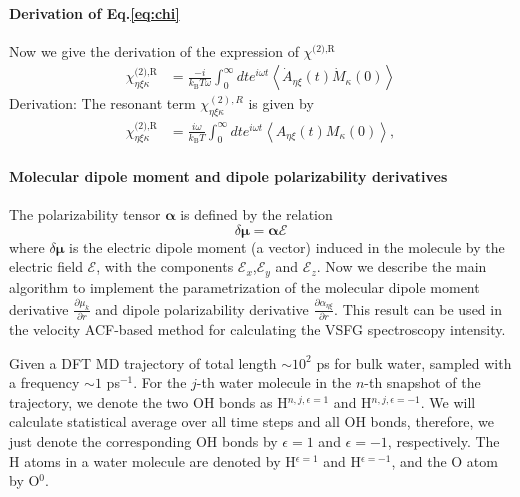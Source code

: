 \paragraph{Derivation of Eq.\thinspace\ref{eq:chi}}
Now we give the derivation of the expression of $\chi^{\text{(2),R}}$
\begin{align}
   \chi^{\text{(2),R}}_{\eta\xi\kappa}&=\frac{-i}{k_{\text{B}}T \omega} \int_0^\infty dt e^{i \omega t}\left\langle \dot{A}_{\eta\xi}(t) \dot{M}_{\kappa}(0)\right\rangle
\end{align}
Derivation: 
The resonant term $\chi^{(2),R}_{\eta\xi\kappa}$ is given by \cite{Morita2008}
\begin{align}
  \chi^{\text{(2),R}}_{\eta\xi\kappa}&=\frac{i\omega}{k_{\text{B}}T} \int_0^\infty dt e^{i \omega t}\left\langle {A}_{\eta\xi}(t) {M}_{\kappa}(0)\right\rangle,
\end{align}

\paragraph{Molecular dipole moment and dipole polarizability derivatives} \label{calculate_derivatives} 

The polarizability tensor $\boldsymbol{\alpha}$ is defined by the relation
\begin{equation}
  \delta \boldsymbol{\mu} = \boldsymbol{\alpha} \boldsymbol{\mathscr{E}}
  \label{eq:def_alpha}
\end{equation}
where $\delta \boldsymbol{\mu}$ is the electric dipole moment (a vector) induced in the molecule by
the electric field $\boldsymbol{\mathscr{E}}$, with the components $\mathscr{E}_x$,$\mathscr{E}_y$ and $\mathscr{E}_z$.
Now we describe the main algorithm to implement the parametrization of the molecular dipole moment 
derivative $\frac{\partial \mu_k}{\partial r}$ and dipole polarizability derivative $\frac{\partial\alpha_{\eta\xi}}{\partial r}$. 
This result can be used in the velocity ACF-based method for calculating the VSFG spectroscopy intensity.

Given a DFT MD trajectory of total length $\sim 10^2$ ps for bulk water, sampled with a frequency $\sim 1$ ps$^{-1}$.
For the $j$-th water molecule in the $n$-th snapshot of the trajectory, 
we denote the two OH bonds as H$^{n,j,\epsilon=1}$ and H$^{n,j,\epsilon=-1}$. We will calculate statistical average over all time steps and all OH bonds, therefore, 
we just denote the corresponding OH bonds by ${\epsilon=1}$ and ${\epsilon=-1}$, respectively. 
The H atoms in a water molecule are denoted by H$^{\epsilon=1}$ and H$^{\epsilon=-1}$, and the O atom by O$^{0}$.


